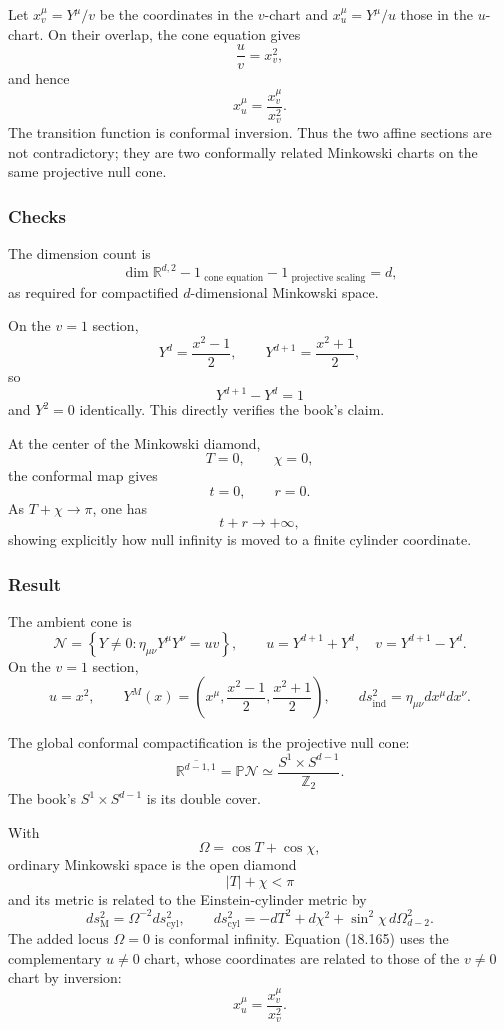 \documentclass[
  10pt,
  a4paper,
  openany]{book}
\begin{document}
Let \(x_v^\mu=Y^\mu/v\) be the coordinates in the \(v\)-chart and
\(x_u^\mu=Y^\mu/u\) those in the \(u\)-chart. On their overlap, the cone
equation gives \[
\frac{u}{v}=x_v^2,
\] and hence \[
\boxed{
x_u^\mu
=\frac{x_v^\mu}{x_v^2}
}.
\] The transition function is conformal inversion. Thus the two affine
sections are not contradictory; they are two conformally related
Minkowski charts on the same projective null cone.

\subsubsection{Checks}\label{checks-38}

The dimension count is \[
\dim\mathbb R^{d,2}
-1_{\text{ cone equation}}
-1_{\text{ projective scaling}}
=d,
\] as required for compactified \(d\)-dimensional Minkowski space.

On the \(v=1\) section, \[
Y^d=\frac{x^2-1}{2},
\qquad
Y^{d+1}=\frac{x^2+1}{2},
\] so \[
Y^{d+1}-Y^d=1
\] and \(Y^2=0\) identically. This directly verifies the book's claim.

At the center of the Minkowski diamond, \[
T=0,
\qquad
\chi=0,
\] the conformal map gives \[
t=0,
\qquad
r=0.
\] As \(T+\chi\to\pi\), one has \[
t+r\to+\infty,
\] showing explicitly how null infinity is moved to a finite cylinder
coordinate.

\subsubsection{Result}\label{result-46}

The ambient cone is \[
\mathcal N
=
\left\{
Y\neq0:
\eta_{\mu\nu}Y^\mu Y^\nu=uv
\right\},
\qquad
u=Y^{d+1}+Y^d,
\quad
v=Y^{d+1}-Y^d.
\] On the \(v=1\) section, \[
\boxed{
u=x^2,
\qquad
Y^M(x)
=
\left(
x^\mu,
\frac{x^2-1}{2},
\frac{x^2+1}{2}
\right),
\qquad
ds_{\mathrm{ind}}^2
=\eta_{\mu\nu}dx^\mu dx^\nu
}.
\]

The global conformal compactification is the projective null cone: \[
\boxed{
\overline{\mathbb R^{d-1,1}}
=\mathbb P\mathcal N
\simeq
\frac{S^1\times S^{d-1}}{\mathbb Z_2}
}.
\] The book's \(S^1\times S^{d-1}\) is its double cover.

With \[
\Omega=\cos T+\cos\chi,
\] ordinary Minkowski space is the open diamond \[
\boxed{
|T|+\chi<\pi
}
\] and its metric is related to the Einstein-cylinder metric by \[
\boxed{
ds_{\mathrm M}^2
=
\Omega^{-2}ds_{\mathrm{cyl}}^2,
\qquad
ds_{\mathrm{cyl}}^2
=
-dT^2+d\chi^2
+\sin^2\chi\,d\Omega_{d-2}^2
}.
\] The added locus \(\Omega=0\) is conformal infinity. Equation (18.165)
uses the complementary \(u\neq0\) chart, whose coordinates are related
to those of the \(v\neq0\) chart by inversion: \[
\boxed{
x_u^\mu
=\frac{x_v^\mu}{x_v^2}
}.
\]
\end{document}

